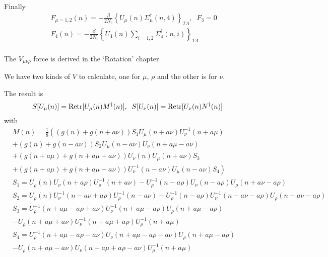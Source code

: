Finally
\begin{equation}
\begin{split}
&F_{\mu=1,2}(n)=-\frac{\beta}{2N_c}\left\{U_{\mu}(n)\Sigma _{\mu}^{\dagger}(n,4)\right\}_{TA},\;\;F_3=0\\
&F_{4}(n)=-\frac{\beta}{2N_c}\left\{U_{4}(n)\sum _{i=1,2}\Sigma _{4}^{\dagger}(n,i)\right\}_{TA}\\
\end{split}
\end{equation}

The $V_{\mu\nu\rho}$ force is derived in the `Rotation' chapter.

We have two kinds of $V$ to calculate, one for $\mu$, $\rho$ and the other is for $\nu$.

The result is
\begin{equation}
  \begin{split}
  &S[U_{\mu}(n)]={\rm Retr}[U_{\mu}(n)M^{\dagger}(n)],\;\; S[U_{\nu}(n)]={\rm Retr}[U_{\nu}(n)N^{\dagger}(n)]
  \end{split}
  \end{equation}
  with
  \textcolor[rgb]{0,0,0.8}{
  \begin{equation}
  \begin{split}
  &M(n)=\frac{1}{8}\left((g(n)+g(n+a\nu))S_1U_{\mu}(n+a\nu)U^{-1}_{\nu}(n+a\mu)\right.\\
  &\left.+(g(n)+g(n-a\nu))S_2U_{\mu}(n-a\nu)U_{\nu}(n+a\mu-a\nu)\right.\\
  &\left.+(g(n+a\mu)+g(n+a\mu+a\nu))U_{\nu}(n)U_{\mu}(n+a\nu)S_3\right.\\
  &\left.+(g(n+a\mu)+g(n+a\mu-a\nu))U^{-1}_{\nu}(n-a\nu)U_{\mu}(n-a\nu)S_4\right)\\
  &S_1=U_{\rho}(n)U_{\nu}(n+a\rho)U^{-1}_{\rho}(n+a\nu)-U^{-1}_{\rho}(n-a\rho)U_{\nu}(n-a\rho)U_{\rho}(n+a\nu-a\rho)\\
  &S_2=U_{\rho}(n)U^{-1}_{\nu}(n-a\nu+a\rho)U^{-1}_{\rho}(n-a\nu)-U^{-1}_{\rho}(n-a\rho)U^{-1}_{\nu}(n-a\nu-a\rho)U_{\rho}(n-a\nu-a\rho)\\
  &S_3=U^{-1}_{\rho}(n+a\mu-a\rho+a\nu)U^{-1}_{\nu}(n+a\mu-a\rho)U_{\rho}(n+a\mu-a\rho)\\
  &-U_{\rho}(n+a\mu+a\nu)U^{-1}_{\nu}(n+a\mu+a\rho)U^{-1}_{\rho}(n+a\mu)\\
  &S_4=U^{-1}_{\rho}(n+a\mu-a\rho-a\nu)U_{\nu}(n+a\mu-a\rho-a\nu)U_{\rho}(n+a\mu-a\rho)\\
  &-U_{\rho}(n+a\mu-a\nu)U_{\nu}(n+a\mu+a\rho-a\nu)U^{-1}_{\rho}(n+a\mu)
  \end{split}
  \end{equation}
  }
